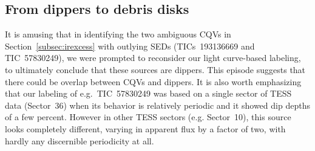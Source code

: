 \documentclass[11pt,twocolumn,tighten]{aastex63}
\begin{document}





\subsection{From dippers to debris disks}
\label{subsec:discdippers}

It is amusing that in identifying the two ambiguous CQVs in
Section~\ref{subsec:irexcess} with outlying SEDs (TICs~193136669 and
TIC~57830249), we were prompted to reconsider our light curve-based
labeling, to
ultimately conclude that these sources are dippers.  This episode
suggests that there could be overlap between CQVs and dippers.  It is also worth emphasizing that our labeling of
e.g.~TIC~57830249 was based on a single sector of TESS data
(Sector~36) when its behavior is relatively periodic and it showed
dip depths of a few percent.  However in other TESS sectors
(e.g. Sector~10), this source looks completely different, varying in
apparent flux by a factor of two, with hardly any discernible
periodicity at all.
\end{document}
